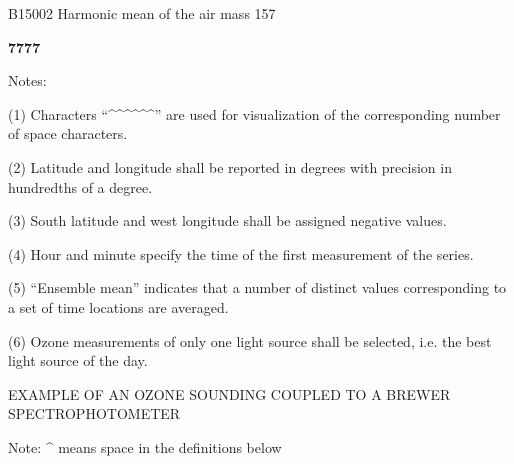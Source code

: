 B15002 Harmonic mean of the air mass 157

\textbf{7777}

Notes:

(1) Characters ``\^{}\^{}\^{}\^{}\^{}\^{}'' are used for visualization of the corresponding number of space characters.

(2) Latitude and longitude shall be reported in degrees with precision in hundredths of a degree.

(3) South latitude and west longitude shall be assigned negative values.

(4) Hour and minute specify the time of the first measurement of the series.

(5) ``Ensemble mean'' indicates that a number of distinct values corresponding to a set of time locations are averaged.

(6) Ozone measurements of only one light source shall be selected, i.e. the best light source of the day.

EXAMPLE OF AN OZONE SOUNDING COUPLED TO A BREWER SPECTROPHOTOMETER

Note: \^{} means space in the definitions below

